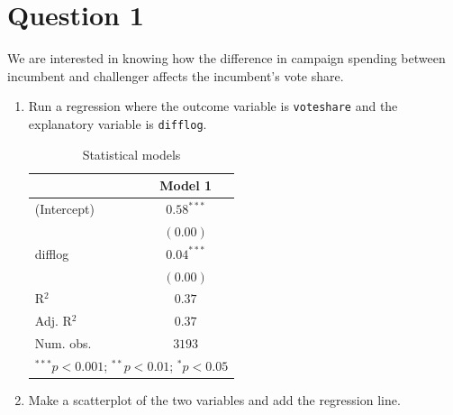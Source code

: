 \documentclass[12pt,letterpaper]{article}
\begin{document}
\section*{Question 1}
\vspace{.25cm}
\noindent We are interested in knowing how the difference in campaign spending between incumbent and challenger affects the incumbent's vote share. 
	\begin{enumerate}
		\item Run a regression where the outcome variable is \texttt{voteshare} and the explanatory variable is \texttt{difflog}.					 
		
		\begin{table}[H]
\begin{center}
\begin{tabular}{l c}
\hline
 & Model 1 \\
\hline
(Intercept) & $0.58^{***}$ \\
            & $(0.00)$     \\
difflog     & $0.04^{***}$ \\
            & $(0.00)$     \\
\hline
R$^2$       & $0.37$       \\
Adj. R$^2$  & $0.37$       \\
Num. obs.   & $3193$       \\
\hline
\multicolumn{2}{l}{\scriptsize{$^{***}p<0.001$; $^{**}p<0.01$; $^{*}p<0.05$}}
\end{tabular}
\caption{Statistical models}
\label{table:coefficients}
\end{center}
\end{table}
		
		

		\item Make a scatterplot of the two variables and add the regression line. 							 


\end{enumerate}
\end{document}
